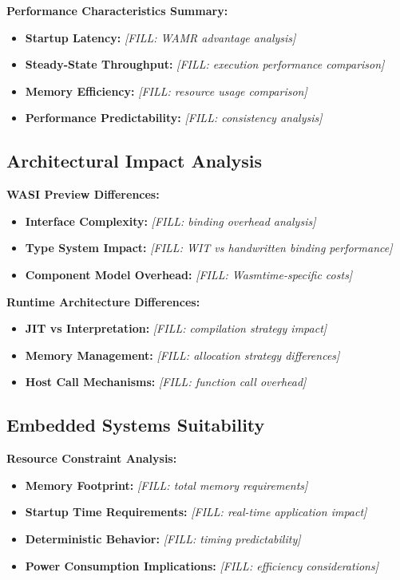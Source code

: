\textbf{Performance Characteristics Summary:}
\begin{itemize}
    \item \textbf{Startup Latency:} \textit{[FILL: WAMR advantage analysis]}
    \item \textbf{Steady-State Throughput:} \textit{[FILL: execution performance comparison]}
    \item \textbf{Memory Efficiency:} \textit{[FILL: resource usage comparison]}
    \item \textbf{Performance Predictability:} \textit{[FILL: consistency analysis]}
\end{itemize}

\subsection{Architectural Impact Analysis}
\label{subsec:architectural-impact}

\textbf{WASI Preview Differences:}
\begin{itemize}
    \item \textbf{Interface Complexity:} \textit{[FILL: binding overhead analysis]}
    \item \textbf{Type System Impact:} \textit{[FILL: WIT vs handwritten binding performance]}
    \item \textbf{Component Model Overhead:} \textit{[FILL: Wasmtime-specific costs]}
\end{itemize}

\textbf{Runtime Architecture Differences:}
\begin{itemize}
    \item \textbf{JIT vs Interpretation:} \textit{[FILL: compilation strategy impact]}
    \item \textbf{Memory Management:} \textit{[FILL: allocation strategy differences]}
    \item \textbf{Host Call Mechanisms:} \textit{[FILL: function call overhead]}
\end{itemize}

\subsection{Embedded Systems Suitability}
\label{subsec:embedded-suitability}

\textbf{Resource Constraint Analysis:}
\begin{itemize}
    \item \textbf{Memory Footprint:} \textit{[FILL: total memory requirements]}
    \item \textbf{Startup Time Requirements:} \textit{[FILL: real-time application impact]}
    \item \textbf{Deterministic Behavior:} \textit{[FILL: timing predictability]}
    \item \textbf{Power Consumption Implications:} \textit{[FILL: efficiency considerations]}
\end{itemize}

